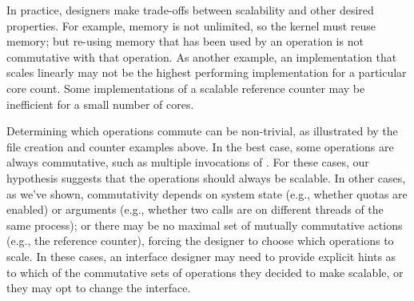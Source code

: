 \noindent
In practice, designers make trade-offs between scalability
and other desired properties.  For example, memory is not
unlimited, so the kernel must reuse memory; but re-using memory that has been used
by an operation is not commutative with that operation. As another example, an
implementation that scales linearly may not be the
highest performing implementation for a particular core count.
Some implementations of a scalable reference counter may be inefficient for a
small number of cores.

Determining which operations commute can be non-trivial, as illustrated
by the file creation and counter examples above.  In the best case,
some operations are always commutative, such as multiple invocations
of .  For these cases, our hypothesis suggests that
the operations should always be scalable.  In other cases, as we've
shown, commutativity depends on system state (e.g., whether quotas are
enabled) or arguments (e.g., whether two  calls are on different
threads of the same process); or there may be no maximal set of mutually
commutative actions (e.g., the reference counter), forcing the designer
to choose which operations to scale.
In these cases, an interface designer
may need to provide explicit hints as to which of the commutative sets
of operations they decided to make scalable, or they may opt to change
the interface.
